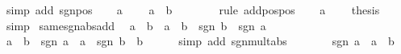 \begin{isabellebody}
\ {\isacharparenleft}{\kern0pt}simp\ add{\isacharcolon}{\kern0pt}\ sgn{\isacharunderscore}{\kern0pt}{}{\isacharunderscore}{\kern0pt}pos{\isacharparenright}{\kern0pt}\isanewline
\ \ \isamarkupfalse%
\ {\isacartoucheopen}a\ {\isachargreater}{\kern0pt}\ {}{\isacartoucheclose}\ \isamarkupfalse%
\ {\isachardoublequoteopen}a\ {\isacharplus}{\kern0pt}\ b\ {\isachargreater}{\kern0pt}\ {}{\isachardoublequoteclose}\isanewline
\ \ \ \ \isamarkupfalse%
\ {\isacharparenleft}{\kern0pt}rule\ add{\isacharunderscore}{\kern0pt}pos{\isacharunderscore}{\kern0pt}pos{\isacharparenright}{\kern0pt}\isanewline
\ \ \isamarkupfalse%
\ {\isacartoucheopen}a\ {\isachargreater}{\kern0pt}\ {}{\isacartoucheclose}\ \isamarkupfalse%
\ {\isacharquery}{\kern0pt}thesis\isanewline
\ \ \ \ \isamarkupfalse%
\ simp\isanewline
{}\isamarkupfalse%
%
\endisatagproof
{\isafoldproof}%
%
\isadelimproof
\isanewline
%
\endisadelimproof
\isanewline
{}\isamarkupfalse%
\ same{\isacharunderscore}{\kern0pt}sgn{\isacharunderscore}{\kern0pt}abs{\isacharunderscore}{\kern0pt}add{\isacharcolon}{\kern0pt}\isanewline
\ \ {\isachardoublequoteopen}{\isasymbar}a\ {\isacharplus}{\kern0pt}\ b{\isasymbar}\ {\isacharequal}{\kern0pt}\ {\isasymbar}a{\isasymbar}\ {\isacharplus}{\kern0pt}\ {\isasymbar}b{\isasymbar}{\isachardoublequoteclose}\ \ {\isachardoublequoteopen}sgn\ b\ {\isacharequal}{\kern0pt}\ sgn\ a{\isachardoublequoteclose}\isanewline
%
\isadelimproof
%
\endisadelimproof
%
\isatagproof
{}\isamarkupfalse%
\ {\isacharminus}{\kern0pt}\isanewline
\ \ \isamarkupfalse%
\ {\isachardoublequoteopen}a\ {\isacharplus}{\kern0pt}\ b\ {\isacharequal}{\kern0pt}\ sgn\ a\ {\isacharasterisk}{\kern0pt}\ {\isasymbar}a{\isasymbar}\ {\isacharplus}{\kern0pt}\ sgn\ b\ {\isacharasterisk}{\kern0pt}\ {\isasymbar}b{\isasymbar}{\isachardoublequoteclose}\isanewline
\ \ \ \ \isamarkupfalse%
\ {\isacharparenleft}{\kern0pt}simp\ add{\isacharcolon}{\kern0pt}\ sgn{\isacharunderscore}{\kern0pt}mult{\isacharunderscore}{\kern0pt}abs{\isacharparenright}{\kern0pt}\isanewline
\ \ \isamarkupfalse%
\ \isamarkupfalse%
\ {\isachardoublequoteopen}{\isasymdots}\ {\isacharequal}{\kern0pt}\ sgn\ a\ {\isacharasterisk}{\kern0pt}\ {\isacharparenleft}{\kern0pt}{\isasymbar}a{\isasymbar}\ {\isacharplus}{\kern0pt}\ {\isasymbar}b{\isasymbar}{\isacharparenright}{\kern0pt}{\isachardoublequoteclose}\isanewline

\end{isabellebody}
